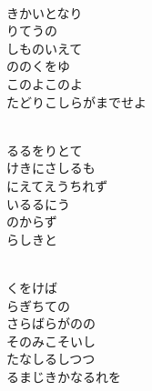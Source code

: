 \documentclass[10pt,b5j]{tarticle} %
\begin{document}
\begin{enumerate}
\begin{minipage}[c]{\blocksize}
    \end{minipage}
    \begin{minipage}[c]{\blocksize}
        
        \vspace{\linespace}
        \item~\\
        きかいとなり\\
        りてうの\\
        しものいえて\\
        ののくをゆ\\
        このよこのよ\\
        たどりこしらがまでせよ
        
    \end{minipage}
    \begin{minipage}[c]{\blocksize}
        
        \vspace{\linespace}
        \item~\\
        るるをりとて\\
        けきにさしるも\\
        にえてえうちれず\\
        いるるにう\\
        のからず\\
        らしきと
        
    \end{minipage}
    \begin{minipage}[c]{\blocksize}
        
        \vspace{\linespace}
        \item~\\
        くをけば\\
        らぎちての\\
        さらばらがのの\\
        そのみこそいし\\
        たなしるしつつ\\
        るまじきかなるれを
    

\end{minipage}
\end{enumerate}
\end{document}
